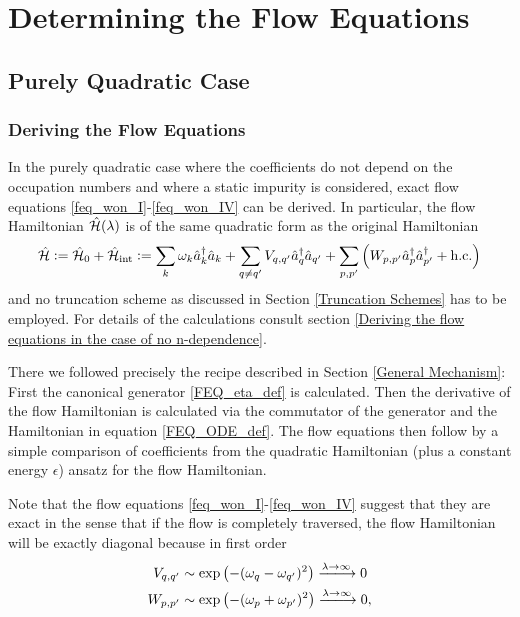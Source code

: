\chapter{Determining the Flow Equations}\label{Determining the Flow Equations}
\section{Purely Quadratic Case}
\subsection{Deriving the Flow Equations}
In the purely quadratic case where the coefficients do not depend on the occupation numbers and where a static impurity is considered, exact flow equations \ref{feq_won_I}-\ref{feq_won_IV} can be derived. In particular, the flow Hamiltonian $\hat{\mathcal{H}}(\lambda)$ is of the same quadratic form as the original Hamiltonian
\begin{equation}\label{def_purely_quadratic_hamiltonian}
\hat{\mathcal{H}} \vcentcolon= \hat{\mathcal{H}}_0+\hat{\mathcal{H}}_{\mathrm{int}} \vcentcolon= \sum\limits_k \omega_k \hat a^\dagger_k\hat a_k+\sum\limits_{q\neq q^\prime}V_{q,q^\prime}\hat a^\dagger_q\hat a_{q^\prime}+\sum\limits_{p,p^\prime}\left(W_{p,p^\prime}\hat a^\dagger_p\hat a^\dagger_{p^\prime}+\mathrm{h.c.}\right)
\end{equation}
 and no truncation scheme as discussed in Section \ref{Truncation Schemes} has to be employed. For details of the calculations consult section \ref{Deriving the flow equations in the case of no n-dependence}.\par 
There we followed precisely the recipe described in Section \ref{General Mechanism}: First the canonical generator \ref{FEQ_eta_def} is calculated. Then the derivative of the flow Hamiltonian is calculated via the commutator of the generator and the Hamiltonian in equation \ref{FEQ_ODE_def}. The flow equations then follow by a simple comparison of coefficients from the quadratic Hamiltonian (plus a constant energy $\epsilon$) ansatz for the flow Hamiltonian.\par
Note that the flow equations \ref{feq_won_I}-\ref{feq_won_IV} suggest that they are exact in the sense that if the flow is completely traversed, the flow Hamiltonian will be exactly diagonal because in first order
\begin{subequations}
\begin{align}
V_{q,q^\prime}&\sim \exp\left(-(\omega_q-\omega_{q^\prime})^2\right)\xlongrightarrow{\lambda\rightarrow\infty}0\\
W_{p,p^\prime}&\sim \exp\left(-(\omega_p+\omega_{p^\prime})^2\right)\xlongrightarrow{\lambda\rightarrow\infty}0,
\end{align}
\end{subequations}
